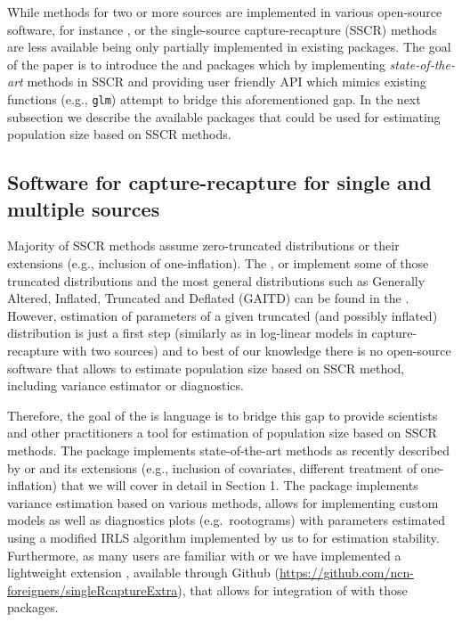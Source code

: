 \documentclass[
]{jss}
\newcommand{\1}{\mathcal{I}} \newcommand{\bZero}{\boldsymbol{0}}
\begin{document}
While methods for two or more sources are implemented in various
open-source software, for instance 
\citep{baillargeon2007rcapture},  \citep{laake2013marked} or
 \citep{yee2015vgam} the single-source capture-recapture
(SSCR) methods are less available being only partially implemented in
existing  packages. The goal of the paper is to introduce
the  and  packages which by
implementing \emph{state-of-the-art} methods in SSCR and providing user
friendly API which mimics existing  functions (e.g.,
\texttt{glm}) attempt to bridge this aforementioned gap. In the next
subsection we describe the available  packages that could be
used for estimating population size based on SSCR methods.

\subsection{Software for capture-recapture for single and multiple
sources}\label{sec-software}

Majority of SSCR methods assume zero-truncated distributions or their
extensions (e.g., inclusion of one-inflation). The 
\citep{countreg},  \citep{VGAM-main} or 
\citep{distributions3} implement some of those truncated distributions
and the most general distributions such as Generally Altered, Inflated,
Truncated and Deflated (GAITD) can be found in the . However,
estimation of parameters of a given truncated (and possibly inflated)
distribution is just a first step (similarly as in log-linear models in
capture-recapture with two sources) and to best of our knowledge there
is no open-source software that allows to estimate population size based
on SSCR method, including variance estimator or diagnostics.

Therefore, the goal of the  is  language
is to bridge this gap to provide scientists and other practitioners a
tool for estimation of population size based on SSCR methods. The
package implements state-of-the-art methods as recently described by
\citet{bohning2018capture} or \citet{bohning2024one} and its extensions
(e.g., inclusion of covariates, different treatment of one-inflation)
that we will cover in detail in Section 1. The package implements
variance estimation based on various methods, allows for implementing
custom models as well as diagnostics plots (e.g.~rootograms) with
parameters estimated using a modified IRLS algorithm implemented by us
to for estimation stability. Furthermore, as many  users are
familiar with  or  we have implemented a
lightweight extension , available through
Github (\url{https://github.com/ncn-foreigners/singleRcaptureExtra}),
that allows for integration of  with those packages.
\end{document}
